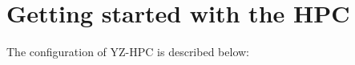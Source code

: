 \documentclass[11pt]{article}
\numberwithin{figure}{section}
\newcommand\CC{\Lang{\mbox{C++}}\xspace}
\newcommand\Lang[1]{\textsc{#1}}
\begin{document}
\maketitle
 
\tableofcontents

\section{Getting started with the HPC}

The configuration of YZ-HPC is described below:
\end{document}
